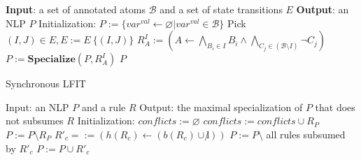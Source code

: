 \begin{algorithm}[ht]
\begin{algorithmic}
\State \textbf{Input}: a set of annotated atoms $\mathcal{B}$ and a set of state transitions $E$
\State \textbf{Output}: an NLP $P$
\State Initialization: $P:= \{var^{val}\gets\varnothing|var^{val}\in \mathcal{B}\}$
    \State Pick $(I,J)\in E,E:= E \ \{(I,J)\}$
        \State $R_A^I:= (A\gets\underset{B_i\in I}{\bigwedge}B_i\land \underset{C_j\in (\mathcal{B}\setminus I)}{\bigwedge}\lnot C_j)$
        \State $P:= \mathbf{Specialize}(P,R_A^I)$
    \EndFor
\EndWhile
\Return $P$
\end{algorithmic}
\caption{Synchronous LFIT}\label{alg:syncLFIT}
\end{algorithm}

\begin{algorithm}[ht]
\begin{algorithmic}
\State Input: an NLP $P$ and a rule $R$
\State Output: the maximal specialization of $P$ that does not subsumes $R$
\State Initialization: $conflicts := \varnothing$
\State{\textcolor{gray}{// Search rules that need to be specialized}}
        \State $conflicts := conflicts\cup R_P$
        \State $P := P \setminus R_P$
    \EndIf
\EndFor
\State{\textcolor{gray}{// Revise the rules by least specialization}}
            \State $R'_c=:= (h(R_c) \gets (b(R_c) \cup \not l))$
                \State $P := P \setminus$ all rules subsumed by $R'_c$
                \State $P := P \cup R'_c$
            \EndIf
        \EndIf
    \EndFor
\EndFor
{}
\end{algorithmic}
\caption{\textbf{Specialize} in synchronous LFIT algorithm%
}\label{alg:specializeLFIT}
\end{algorithm}


